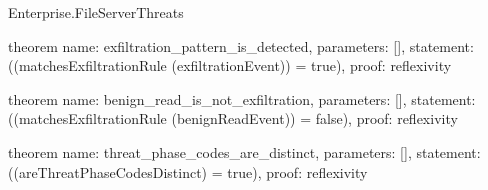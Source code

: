 \begin{lexlean}{Enterprise.FileServerThreats}
\begin{semanticmodule}
theorem{
  name: exfiltration_pattern_is_detected,
  parameters: [],
  statement: ((matchesExfiltrationRule (exfiltrationEvent)) = true),
  proof: reflexivity{}
}

theorem{
  name: benign_read_is_not_exfiltration,
  parameters: [],
  statement: ((matchesExfiltrationRule (benignReadEvent)) = false),
  proof: reflexivity{}
}

theorem{
  name: threat_phase_codes_are_distinct,
  parameters: [],
  statement: ((areThreatPhaseCodesDistinct) = true),
  proof: reflexivity{}
}
\end{semanticmodule}
\end{lexlean}
